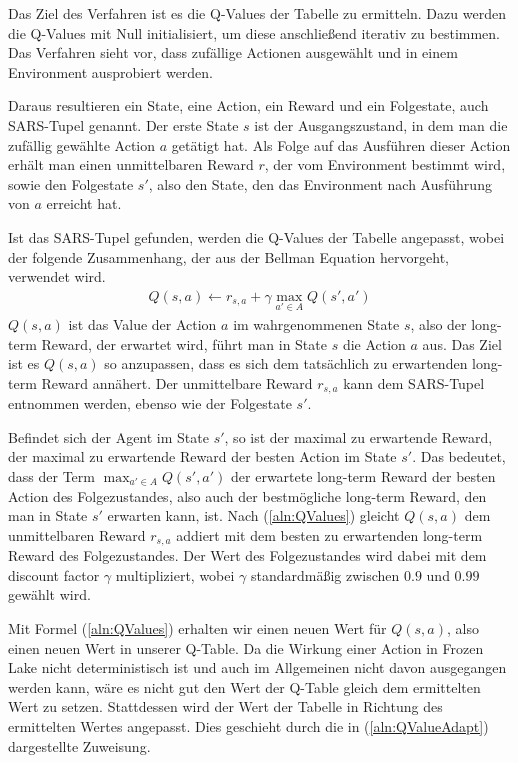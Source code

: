 \documentclass[11pt]{scrartcl}
\begin{document}
\noindent
Das Ziel des Verfahren ist es die Q-Values der Tabelle zu ermitteln. Dazu werden die
Q-Values mit Null initialisiert, um diese anschließend iterativ zu bestimmen. Das Verfahren 
sieht vor, dass zufällige Actionen ausgewählt und in einem Environment ausprobiert werden.

Daraus resultieren ein State, eine Action, ein Reward und ein Folgestate, auch SARS-Tupel
genannt. Der erste State $s$ ist der Ausgangszustand, in dem man die zufällig gewählte
Action $a$ getätigt hat. Als Folge auf das Ausführen dieser Action erhält man einen
unmittelbaren Reward $r$, der vom Environment bestimmt wird, sowie den Folgestate $s'$,
also den State, den das Environment nach Ausführung von $a$ erreicht hat.

Ist das SARS-Tupel gefunden, werden die Q-Values der Tabelle angepasst, wobei der folgende
Zusammenhang, der aus der Bellman Equation hervorgeht, verwendet wird.
\begin{align}
Q(s, a) \leftarrow r_{s,a} + \gamma \max_{a' \in A}Q(s', a')
\label{aln:QValues}
\end{align}
\noindent
$Q(s, a)$ ist das Value der Action $a$ im wahrgenommenen State $s$, also der long-term
Reward, der erwartet wird, führt man in State $s$ die Action $a$ aus. Das Ziel ist es
$Q(s, a)$ so anzupassen, dass es sich dem tatsächlich zu erwartenden long-term Reward
annähert. Der unmittelbare Reward $r_{s,a}$ kann dem SARS-Tupel entnommen werden, ebenso
wie der Folgestate $s'$.

Befindet sich der Agent im State $s'$, so ist der maximal zu erwartende Reward, der 
maximal zu erwartende Reward der besten Action im State $s'$. Das bedeutet, dass
der Term $\max_{a'\in A} Q(s', a')$ der erwartete long-term Reward der besten Action des
Folgezustandes, also auch der bestmögliche long-term Reward, den man in State $s'$
erwarten kann, ist. Nach (\ref{aln:QValues}) gleicht $Q(s, a)$ dem unmittelbaren Reward
$r_{s,a}$ addiert mit dem besten zu erwartenden long-term Reward des Folgezustandes. Der
Wert des Folgezustandes wird dabei mit dem discount factor $\gamma$ multipliziert, wobei 
$\gamma$ standardmäßig zwischen $0.9$ und $0.99$ gewählt wird.

Mit Formel (\ref{aln:QValues}) erhalten wir einen neuen Wert für $Q(s, a)$, also einen
neuen Wert in unserer Q-Table. Da die Wirkung einer Action in Frozen Lake nicht
deterministisch ist und auch im Allgemeinen nicht davon ausgegangen werden kann, wäre es
nicht gut den Wert der Q-Table gleich dem ermittelten Wert zu setzen. Stattdessen wird der
Wert der Tabelle in Richtung des ermittelten Wertes angepasst. Dies geschieht durch die in
(\ref{aln:QValueAdapt}) dargestellte Zuweisung.
\end{document}
